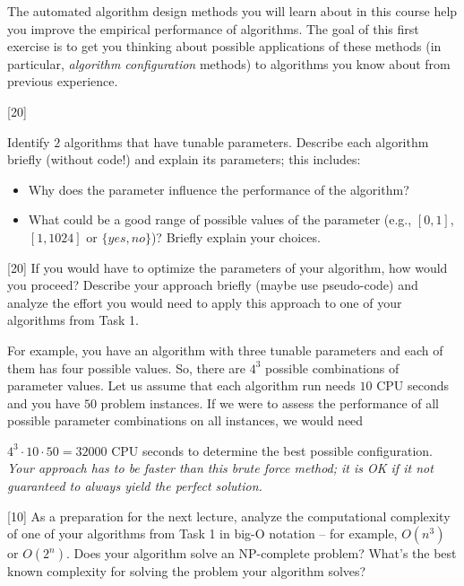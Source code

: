 \documentclass{exam}
\newcommand{\note}[1]{
	\noindent~\\
	\vspace{0.25cm}
	\fcolorbox{Red}{Orange}{\parbox{0.99\textwidth}{#1\\}}
	\vspace{0.25cm}
}
\renewcommand{\note}[1]{}
\begin{document}
\note{Careful: ``Algorithm design'' is obviously what everyone does. ``Automated''!}
The automated algorithm design methods you will learn about in this course help you improve the empirical performance of algorithms.
The goal of this first exercise is to get you thinking about possible applications of these methods (in particular, \emph{algorithm configuration} methods) to algorithms you know about from previous experience.

\begin{questions}
	[20]
	\note{We should in general avoid to say ``Parameterized algorithms'' since too many people confuse it with ``Parameterized complexity''. Rather say ``algorithms with parameters''. ``Highly-parameterized algorithms'' is also OK.}
		Identify $2$ algorithms that have tunable parameters. Describe each algorithm briefly (without code!) and explain its parameters; this includes:
		\begin{itemize}
		  \item Why does the parameter influence the performance of the algorithm? 
		  \item What could be a good range of possible values of the parameter (e.g., $[0,1]$, $[1,1024]$ or $\{yes,no\}$)? Briefly explain your choices.
		\end{itemize}
		
	[20]
		If you would have to optimize the parameters of your algorithm, how would you proceed? Describe your approach briefly (maybe use pseudo-code) and analyze the effort you would need to apply this approach to one of your algorithms from Task 1. 
		
		For example, you have an algorithm with three tunable parameters and each of them has four possible values. So, there are $4^3$ possible combinations of parameter values. Let us assume that each algorithm run needs 
		$10$ CPU seconds and you have $50$ problem instances. 
		If we were to assess the performance of all possible parameter combinations on all instances, we would need 
		\note{it was ``at most'' before and here ``at least''; that's inconsistent; I dropped both.}
		$4^3 \cdot 10 \cdot 50 = 32000$ CPU seconds to determine the best possible configuration. 
		\emph{Your approach has to be faster than this brute force method; it is OK if it not guaranteed to always yield the perfect solution.}
		\note{I added the part about no performance guarantee being necessary since this problem otherwise does not have a general solution.}
	
	[10]
		As a preparation for the next lecture, analyze the computational complexity of one of your algorithms from Task 1 in big-O notation -- for example, $O(n^3)$ or $O(2^n)$. 
		Does your algorithm solve an NP-complete problem? What's the best known complexity for solving the problem your algorithm solves?
\end{questions}
\end{document}
